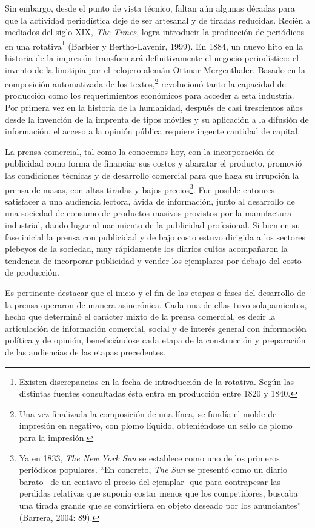{Sin embargo, desde el punto de vista técnico, faltan aún algunas décadas para que la actividad periodística deje de ser artesanal y de tiradas reducidas. Recién a mediados del siglo XIX, \emph{The Times}, logra introducir la producción de periódicos en una rotativa\footnote{Existen discrepancias en la fecha de introducción de la rotativa. Según las distintas fuentes consultadas ésta entra en producción entre 1820 y 1840.} (Barbier y Bertho-Lavenir, 1999). En 1884, un nuevo hito en la historia de la impresión transformará definitivamente el negocio periodístico: el invento de la linotipia por el relojero alemán Ottmar Mergenthaler. Basado en la composición automatizada de los textos,\footnote{Una vez finalizada la composición de una línea, se fundía el molde de impresión en negativo, con plomo líquido, obteniéndose un sello de plomo para la impresión.} revolucionó tanto la capacidad de producción como los requerimientos económicos para acceder a esta industria. Por primera vez en la historia de la humanidad, después de casi trescientos años desde la invención de la imprenta de tipos móviles y su aplicación a la difusión de información, el acceso a la opinión pública requiere ingente cantidad de capital.

La prensa comercial, tal como la conocemos hoy, con la incorporación de publicidad como forma de financiar sus costos y abaratar el producto, promovió las condiciones técnicas y de desarrollo comercial para que haga su irrupción la prensa de masas, con altas tiradas y bajos precios\footnote{Ya en 1833, \emph{The New York Sun} se establece como uno de los primeros periódicos populares. ``En concreto, \emph{The} \emph{Sun} se presentó como un diario barato --de un centavo el precio del ejemplar- que para contrapesar las perdidas relativas que suponía costar menos que los competidores, buscaba una tirada grande que se convirtiera en objeto deseado por los anunciantes'' (Barrera, 2004: 89).}. Fue posible entonces satisfacer a una audiencia lectora, ávida de información, junto al desarrollo de una sociedad de consumo de productos masivos provistos por la manufactura industrial, dando lugar al nacimiento de la publicidad profesional. Si bien en su fase inicial la prensa con publicidad y de bajo costo estuvo dirigida a los sectores plebeyos de la sociedad, muy rápidamente los diarios cultos acompañaron la tendencia de incorporar publicidad y vender los ejemplares por debajo del costo de producción.

Es pertinente destacar que el inicio y el fin de las etapas o fases del desarrollo de la prensa operaron de manera asincrónica. Cada una de ellas tuvo solapamientos, hecho que determinó el carácter mixto de la prensa comercial, es decir la articulación de información comercial, social y de interés general con información política y de opinión, beneficiándose cada etapa de la construcción y preparación de las audiencias de las etapas precedentes.

}
